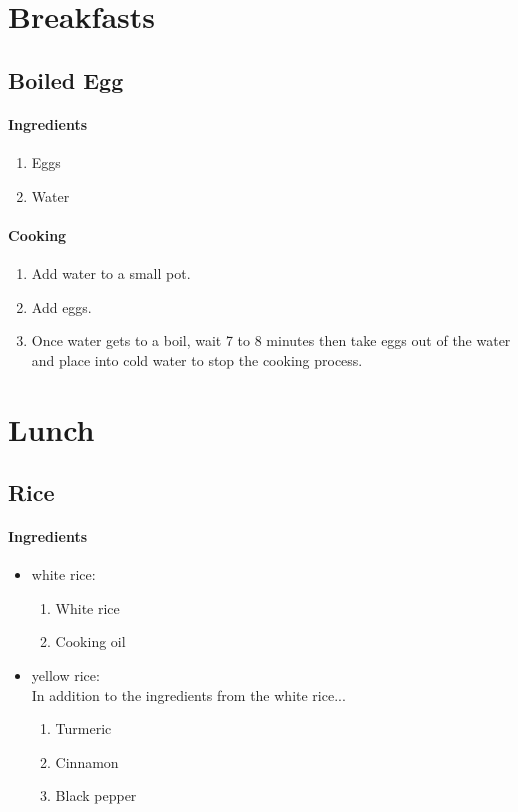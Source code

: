 
\chapter{Breakfasts}
\section{Boiled Egg}
\subsubsection{Ingredients}
\begin{enumerate}
    \item Eggs
    \item Water
\end{enumerate}

\subsubsection{Cooking}
\begin{enumerate}
    \item Add water to a small pot.
    \item Add eggs.
    \item Once water gets to a boil, wait 7 to 8 minutes then take eggs out of the water and place into cold water to stop the cooking process.
\end{enumerate}

\chapter{Lunch}
\section{Rice}
\subsubsection{Ingredients}
\begin{itemize}
    \item white rice:
    \begin{enumerate}
        \item White rice
        \item Cooking oil
    \end{enumerate}
    \item yellow rice:\\ In addition to the ingredients from the white rice...
    \begin{enumerate}
        \item Turmeric
        \item Cinnamon
        \item Black pepper
    \end{enumerate}
\end{itemize}

